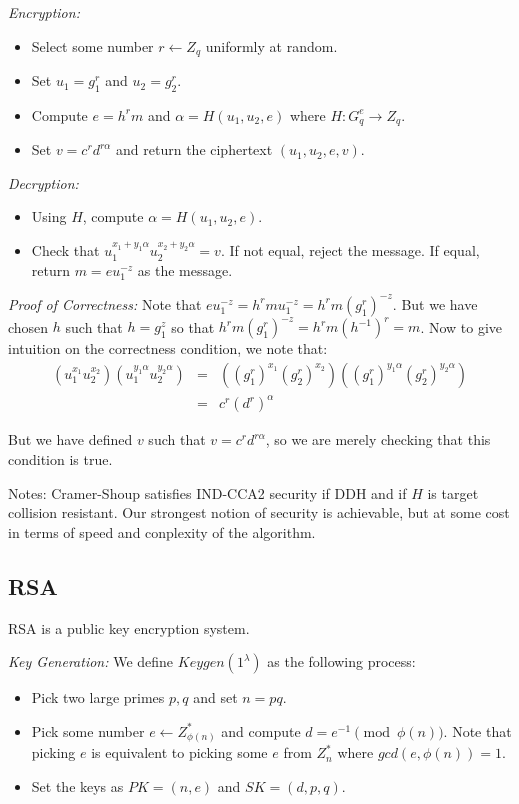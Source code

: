 \documentclass[psamsfonts]{amsart}
\begin{document}
\emph{Encryption:}
\begin{itemize}
  \item Select some number $r \leftarrow Z_q$ uniformly at random.
  \item Set $u_1 = g_1^{r}$ and $u_2 = g_2^{r}$.
  \item Compute $e = h^r m$ and $\alpha = H(u_1, u_2, e)$ where $H: G_q^{e} \to Z_q$.
  \item Set $v = c^r d^{r \alpha}$ and return the ciphertext $(u_1, u_2, e, v)$.
\end{itemize}

\emph{Decryption:}
\begin{itemize}
  \item Using $H$, compute $\alpha = H(u_1, u_2, e)$.
  \item Check that $u_1^{x_1 + y_1 \alpha} u_2^{x_2 + y_2 \alpha} = v$. If not equal, reject the message. If equal, return $m = e u_1^{-z}$ as the message.
\end{itemize}

\emph{Proof of Correctness:} Note that $e u_1^{-z} = h^r m u_1^{-z} = h^r m (g_1^{r})^{-z}$. But we have chosen $h$ such that $h = g_1^z$ so that $h^r m (g_1^{r})^{-z} = h^r m (h^{-1})^r = m$. Now to give intuition on the correctness condition, we note that:
\begin{eqnarray}
  (u_1^{x_1} u_2^{x_2})(u_1^{y_1 \alpha} u_2^{y_2 \alpha}) &=& ((g_1^{r})^{x_1}(g_2^{r})^{x_2})((g_1^{r})^{y_1 \alpha} (g_2^{r})^{y_2 \alpha}) \\
                                                           &=& c^r (d^r)^\alpha
\end{eqnarray}

But we have defined $v$ such that $v = c^r d^{r \alpha}$, so we are merely checking that this condition is true.

Notes: Cramer-Shoup satisfies IND-CCA2 security if DDH and if $H$ is target collision resistant. Our strongest notion of security is achievable, but at some cost in terms of speed and conplexity of the algorithm.

\subsection{RSA}

RSA is a public key encryption system.

\emph{Key Generation:} We define $Keygen(1^\lambda)$ as the following process:
\begin{itemize}
  \item Pick two large primes $p,q$ and set $n = pq$.
  \item Pick some number $e \leftarrow Z_{\phi(n)}^*$ and compute $d = e^{-1} \pmod{\phi(n)}$. Note that picking $e$ is equivalent to picking some $e$ from $Z_n^*$ where $gcd(e, \phi(n)) = 1$.
  \item Set the keys as $PK = (n, e)$ and $SK = (d, p, q)$.
\end{itemize}
\end{document}
